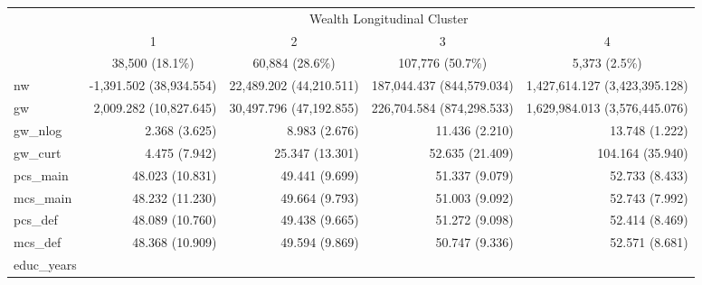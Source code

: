 \begin{table}[!h]
\centering
\begin{tabular}{lllll}
\cline{1-5}
\multicolumn{1}{r}{} &
  \multicolumn{4}{c}{Wealth Longitudinal Cluster} \\
\multicolumn{1}{r}{} &
  \multicolumn{1}{c}{1} &
  \multicolumn{1}{c}{2} &
  \multicolumn{1}{c}{3} &
  \multicolumn{1}{c}{4} \\
\multicolumn{1}{r}{} &
  \multicolumn{1}{c}{38,500 (18.1\%)} &
  \multicolumn{1}{c}{60,884 (28.6\%)} &
  \multicolumn{1}{c}{107,776 (50.7\%)} &
  \multicolumn{1}{c}{5,373 (2.5\%)} \\
\cline{1-5}
\multicolumn{1}{l}{nw} &
  \multicolumn{1}{r}{-1,391.502 (38,934.554)} &
  \multicolumn{1}{r}{22,489.202 (44,210.511)} &
  \multicolumn{1}{r}{187,044.437 (844,579.034)} &
  \multicolumn{1}{r}{1,427,614.127 (3,423,395.128)} \\
\multicolumn{1}{l}{gw} &
  \multicolumn{1}{r}{2,009.282 (10,827.645)} &
  \multicolumn{1}{r}{30,497.796 (47,192.855)} &
  \multicolumn{1}{r}{226,704.584 (874,298.533)} &
  \multicolumn{1}{r}{1,629,984.013 (3,576,445.076)} \\
\multicolumn{1}{l}{gw\_nlog} &
  \multicolumn{1}{r}{2.368 (3.625)} &
  \multicolumn{1}{r}{8.983 (2.676)} &
  \multicolumn{1}{r}{11.436 (2.210)} &
  \multicolumn{1}{r}{13.748 (1.222)} \\
\multicolumn{1}{l}{gw\_curt} &
  \multicolumn{1}{r}{4.475 (7.942)} &
  \multicolumn{1}{r}{25.347 (13.301)} &
  \multicolumn{1}{r}{52.635 (21.409)} &
  \multicolumn{1}{r}{104.164 (35.940)} \\
\multicolumn{1}{l}{pcs\_main} &
  \multicolumn{1}{r}{48.023 (10.831)} &
  \multicolumn{1}{r}{49.441 (9.699)} &
  \multicolumn{1}{r}{51.337 (9.079)} &
  \multicolumn{1}{r}{52.733 (8.433)} \\
\multicolumn{1}{l}{mcs\_main} &
  \multicolumn{1}{r}{48.232 (11.230)} &
  \multicolumn{1}{r}{49.664 (9.793)} &
  \multicolumn{1}{r}{51.003 (9.092)} &
  \multicolumn{1}{r}{52.743 (7.992)} \\
\multicolumn{1}{l}{pcs\_def} &
  \multicolumn{1}{r}{48.089 (10.760)} &
  \multicolumn{1}{r}{49.438 (9.665)} &
  \multicolumn{1}{r}{51.272 (9.098)} &
  \multicolumn{1}{r}{52.414 (8.469)} \\
\multicolumn{1}{l}{mcs\_def} &
  \multicolumn{1}{r}{48.368 (10.909)} &
  \multicolumn{1}{r}{49.594 (9.869)} &
  \multicolumn{1}{r}{50.747 (9.336)} &
  \multicolumn{1}{r}{52.571 (8.681)} \\
\multicolumn{1}{l}{educ\_years} &

\end{tabular}
\end{table}
